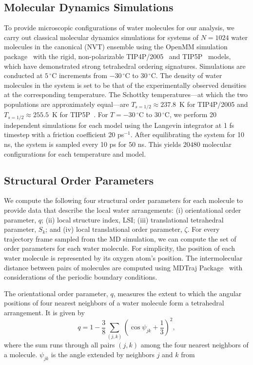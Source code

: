 \documentclass[aps, amsmath,amssymb, reprint, twocolumn, superscriptaddress]{revtex4-1}
\begin{document}
\subsection{Molecular Dynamics Simulations}
To provide microscopic configurations of water molecules for our analysis, we carry out classical molecular dynamics simulations for systems of $N = 1024$ water molecules in the canonical (NVT) ensemble using the OpenMM simulation package~\cite{eastman_openmm_2015}  with the rigid, non-polarizable TIP4P/2005~\cite{abascal_general_2005} and TIP5P~\cite{mahoney_five-site_2000} models, which have demonstrated strong tetrahedral ordering signatures.\cite{shi_direct_2020} Simulations are conducted at $5\,^\circ$C increments from  $-30\,^\circ$C to $30\,^\circ$C. The density of water molecules in the system is set to be that of the experimentally observed densities at the corresponding temperature. The Schottky temperatures---at which the two populations are approximately equal---are $T_{s=1/2} \approx 237.8$~K for TIP4P/2005 and $T_{s=1/2} \approx 255.5$~K for TIP5P~\cite{shi_direct_2020}. For $T=-30\,^\circ$C to $30\,^\circ$C, we perform 20 independent simulations for each model using the Langevin integrator at 1 fs timestep with a friction coefficient 20 ps$^{-1}$. After equilibrating the system for 10 ns, the system is sampled every 10 ps for 50 ns. This yields $20480$ molecular configurations for each temperature and model. 

\subsection{Structural Order Parameters}
\label{sec:structural_order_parameter}
We compute the following four structural order parameters for each molecule to provide data that describe the local water arrangements: (i) orientational order parameter, $q$; (ii) local structure index, LSI; (iii) translational tetrahedral parameter, $S_k$; and (iv) local translational order parameter, $\zeta$. For every trajectory frame sampled from the MD simulation, we can compute the set of order parameters for each water molecule. For simplicity, the position of each water molecule is represented by its oxygen atom's position. The intermolecular distance between pairs of molecules are computed using MDTraj Package~\cite{mcgibbon_mdtraj_2015} with considerations of the periodic boundary conditions. 

The orientational order parameter, $q$, measures the extent to which the angular positions of four nearest neighbors of a water molecule form a tetrahedral arrangement. It is given by~\cite{chau_new_1998,errington_relationship_2001}
\begin{equation}
q = 1 - \frac{3}{8}\sum_{(j,k)}\left(\cos\psi_{jk}+\frac{1}{3}\right)^{2},
\end{equation}
where the sum runs through all pairs $(j,k)$ among the four nearest neighbors of a molecule. $\psi_{jk}$ is the angle extended by neighbors $j$ and $k$ from 
\end{document}
